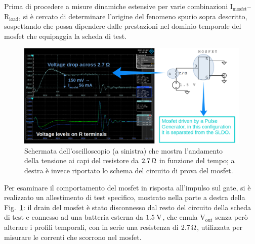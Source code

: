 Prima di procedere a misure dinamiche estensive per varie combinazioni $\mathrm{I_{mosfet}}$--$\mathrm{R_{load}}$, si è cercato di determinare l'origine del fenomeno spurio sopra descritto, sospettando che possa dipendere dalle prestazioni nel dominio temporale del mosfet che equipaggia la scheda di test.


\begin{figure}
\centering
\includegraphics[width=\linewidth]{Immagini/MosfetBehaviourbis}
\caption{Schermata dell'oscilloscopio (a sinistra) che mostra l'andamento della tensione ai capi del resistore da $2.7{\rm \, \Omega}$ in funzione del tempo; a destra è invece riportato lo schema del circuito di prova del mosfet.}
\label{MosfetBehaviour}
\end{figure}

Per esaminare il comportamento del mosfet in risposta all'impulso sul gate, si è realizzato un allestimento di test specifico, mostrato nella parte a destra della Fig.~\ref{MosfetBehaviour}: il drain del mosfet è stato disconnesso dal resto del circuito della scheda di test e connesso ad una batteria esterna da $1.5\rm \; V$, che emula $\mathrm{V_{out}}$ senza per\`o alterare i profili temporali, con in serie una resistenza di $2.7{\rm \, \Omega}$, utilizzata per misurare le correnti che scorrono nel mosfet. 

